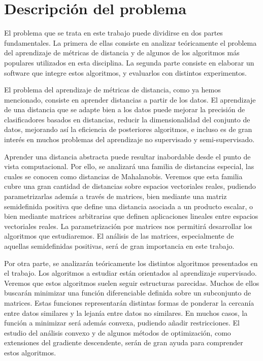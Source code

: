 \section{Descripción del problema}

El problema que se trata en este trabajo puede dividirse en dos partes fundamentales. La primera de ellas consiste en analizar teóricamente el problema del aprendizaje de métricas de distancia y de algunos de los algoritmos más populares utilizados en esta disciplina. La segunda parte consiste en elaborar un software que integre estos algoritmos, y evaluarlos con distintos experimentos.

El problema del aprendizaje de métricas de distancia, como ya hemos mencionado, consiste en aprender distancias a partir de los datos. El aprendizaje de una distancia que se adapte bien a los datos puede mejorar la precisión de clasificadores basados en distancias, reducir la dimensionalidad del conjunto de datos, mejorando así la eficiencia de posteriores algoritmos, e incluso es de gran interés en muchos problemas del aprendizaje no supervisado y semi-supervisado.

Aprender una distancia abstracta puede resultar inabordable desde el punto de vista computacional. Por ello, se analizará una familia de distancias especial, las cuales se conocen como distancias de Mahalanobis. Veremos que esta familia cubre una gran cantidad de distancias sobre espacios vectoriales reales, pudiendo parametrizarlas además a través de matrices, bien mediante una matriz semidefinida positiva que define una distancia asociada a un producto escalar, o bien mediante matrices arbitrarias que definen aplicaciones lineales entre espacios vectoriales reales. La parametrización por matrices nos permitirá desarrollar los algoritmos que estudiaremos. El análisis de las matrices, especialmente de aquellas semidefinidas positivas, será de gran importancia en este trabajo.

Por otra parte, se analizarán teóricamente los distintos algoritmos presentados en el trabajo. Los algoritmos a estudiar están orientados al aprendizaje supervisado. Veremos que estos algoritmos suelen seguir estructuras parecidas. Muchos de ellos buscarán minimizar una función diferenciable definida sobre un subconjunto de matrices. Estas funciones representarán distintas formas de ponderar la cercanía entre datos similares y la lejanía entre datos no similares. En muchos casos, la función a minimizar será además convexa, pudiendo añadir restricciones. El estudio del análisis convexo y de algunos métodos de optimización, como extensiones del gradiente descendente, serán de gran ayuda para comprender estos algoritmos.

